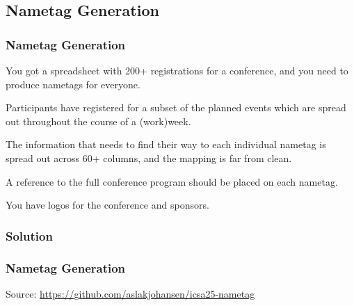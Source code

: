 {\subsection{Nametag Generation}
\begin{frame}[fragile]
  \frametitle{Nametag Generation}
  \vspace{3mm}
  You got a spreadsheet with 200+ registrations for a conference, and you need to produce nametags for everyone.
  
  \vspace{5mm}
  Participants have registered for a subset of the planned events which are spread out throughout the course of a (work)week.
  
  \vspace{5mm}
  The information that needs to find their way to each individual nametag is spread out across 60+ columns, and the mapping is far from clean.
  
  \vspace{5mm}
  A reference to the full conference program should be placed on each nametag.
  
  \vspace{5mm}
  You have logos for the conference and sponsors.
\end{frame}

\subsubsection{Solution}
\begin{frame}[fragile]
  \frametitle{Nametag Generation }
  \vspace{3mm}
  
  \vspace{5mm}
  Source: \url{https://github.com/aslakjohansen/icsa25-nametag}
\end{frame}

}
